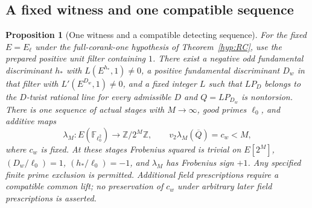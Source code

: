 \documentclass[11pt]{article}
\newtheorem{proposition}[theorem]{Proposition}
\theoremstyle{definition}
\theoremstyle{remark}
\newcommand{\Z}{\mathbb Z}
\newcommand{\F}{\mathbb F}
\begin{document}
\subsection{A fixed witness and one compatible sequence}
\begin{proposition}[One witness and a compatible detecting sequence]\label{ex:app-detector}
For the fixed $E=E_\ell$ under the full-corank-one hypothesis of
Theorem~\ref{hyp:RC}, use the prepared positive unit filter containing
$1$. There exist a negative odd fundamental discriminant $h_*$ with
$L(E^{h_*},1)\ne0$, a positive fundamental discriminant $D_w$ in
that filter with $L'(E^{D_w},1)\ne0$, and a fixed integer $L$ such
that $LP_D$ belongs to the $D$-twist rational line for every
admissible $D$ and $Q=LP_{D_w}$ is nontorsion.
There is one sequence of actual stages with $M\to\infty$, good
primes $\ell_0$, and additive maps
\[
 \lambda_M:E(\F_{\ell_0^2})\longrightarrow\Z/2^M\Z,
 \qquad v_2\lambda_M(\overline Q)=c_w<M,
\]
where $c_w$ is fixed. At these stages Frobenius squared is trivial
on $E[2^M]$, $(D_w/\ell_0)=1$, $(h_*/\ell_0)=-1$, and
$\lambda_M$ has Frobenius sign $+1$.
Any specified finite prime exclusion is permitted. Additional
field prescriptions require a compatible common lift; no preservation
of $c_w$ under arbitrary later field prescriptions is asserted.
\end{proposition}
\end{document}
